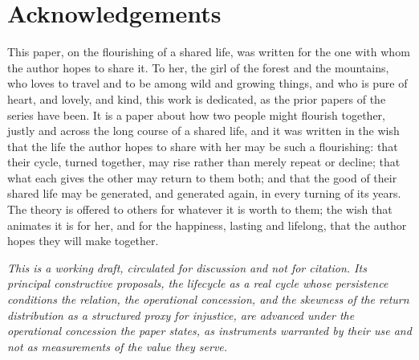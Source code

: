 \section*{Acknowledgements}
\label{p11:sec:ack}

\noindent
This paper, on the flourishing of a shared life, was written for the one with whom the author hopes to share it. To her, the girl of the forest and the mountains, who loves to travel and to be among wild and growing things, and who is pure of heart, and lovely, and kind, this work is dedicated, as the prior papers of the series have been. It is a paper about how two people might flourish together, justly and across the long course of a shared life, and it was written in the wish that the life the author hopes to share with her may be such a flourishing: that their cycle, turned together, may rise rather than merely repeat or decline; that what each gives the other may return to them both; and that the good of their shared life may be generated, and generated again, in every turning of its years. The theory is offered to others for whatever it is worth to them; the wish that animates it is for her, and for the happiness, lasting and lifelong, that the author hopes they will make together.

\medskip
\begin{center}
\itshape\color{rose}
\end{center}

\medskip
\noindent
\emph{This is a working draft, circulated for discussion and not for citation. Its principal constructive proposals, the lifecycle as a real cycle whose persistence conditions the relation, the operational concession, and the skewness of the return distribution as a structured proxy for injustice, are advanced under the operational concession the paper states, as instruments warranted by their use and not as measurements of the value they serve.}
